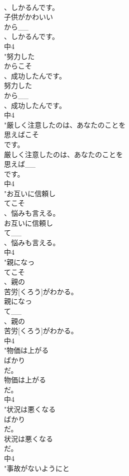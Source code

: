 \documentclass[8pt]{extreport}
\begin{document}
\begin{CJK}{UTF8}{min}
\\	、しかるんです。
\\	子供がかわいい
\\	から__
\\	、しかるんです。
\\	中4
\\	"努力した
\\	からこそ
\\	、成功したんです。
\\	努力した
\\	から__
\\	、成功したんです。
\\	中4
\\	"厳しく注意したのは、あなたのことを
\\	思えばこそ
\\	です。
\\	厳しく注意したのは、あなたのことを
\\	思えば__
\\	です。
\\	中4
\\	"お互いに信頼し
\\	てこそ
\\	、悩みも言える。
\\	お互いに信頼し
\\	て__
\\	、悩みも言える。
\\	中4
\\	"親になっ
\\	てこそ
\\	、親の
\\	苦労[くろう]がわかる。
\\	親になっ
\\	て__
\\	、親の
\\	苦労[くろう]がわかる。
\\	中4
\\	"物価は上がる
\\	ばかり
\\	だ。
\\	物価は上がる
\\	だ。
\\	中4
\\	"状況は悪くなる
\\	ばかり
\\	だ。
\\	状況は悪くなる
\\	だ。
\\	中4
\\	"事故がないようにと

\end{CJK}
\end{document}

